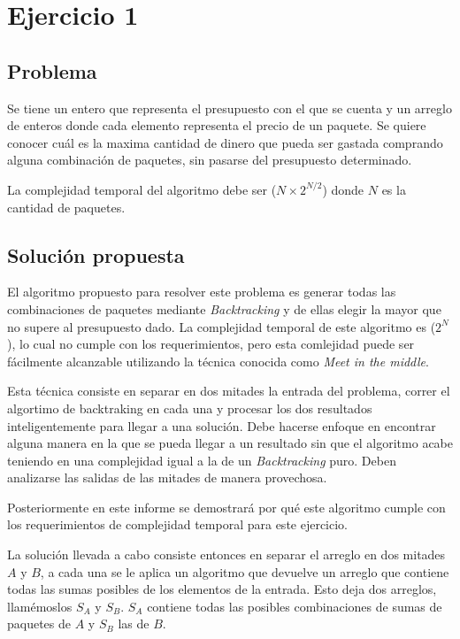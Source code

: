 \section{Ejercicio 1}

\subsection{Problema}

Se tiene un entero que representa el presupuesto con el que se cuenta y un
arreglo de enteros donde cada elemento representa el precio de un paquete. Se
quiere conocer cuál es la maxima cantidad de dinero que pueda ser gastada
comprando alguna combinación de paquetes, sin pasarse del presupuesto
determinado.

La complejidad temporal del algoritmo debe ser \ord($N \times 2^{N / 2}$) donde
$N$ es la cantidad de paquetes.

\subsection{Solución propuesta}

El algoritmo propuesto para resolver este problema es generar todas las
combinaciones de paquetes mediante \textit{Backtracking} y de ellas elegir la
mayor que no supere al presupuesto dado. La complejidad temporal de este
algoritmo es \ord($2^N$), lo cual no cumple con los requerimientos, pero esta
comlejidad puede ser fácilmente alcanzable utilizando la técnica conocida como
\textit{Meet in the middle}.

Esta técnica consiste en separar en dos mitades la entrada del problema, correr
el algortimo de backtraking en cada una y procesar los dos resultados
inteligentemente para llegar a una solución. Debe hacerse enfoque en encontrar
alguna manera en la que se pueda llegar a un resultado sin que el algoritmo
acabe teniendo en una complejidad igual a la de un \textit{Backtracking} puro.
Deben analizarse las salidas de las mitades de manera provechosa.

Posteriormente en este informe se demostrará por qué este algoritmo cumple con
los requerimientos de complejidad temporal para este ejercicio.

La solución llevada a cabo consiste entonces en separar el arreglo en dos
mitades $A$ y $B$, a cada una se le aplica un algoritmo que devuelve un arreglo
que contiene todas las sumas posibles de los elementos de la entrada. Esto deja
dos arreglos, llamémoslos $S_A$ y $S_B$. $S_A$ contiene todas las posibles
combinaciones de sumas de paquetes de $A$ y $S_B$ las de $B$.


